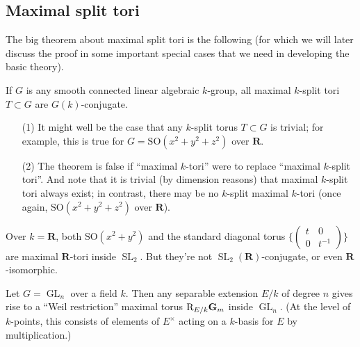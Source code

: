 \documentclass[10pt]{article}
\newcommand{\RR}{\mathbf{R}}
\newcommand{\GL}{\operatorname{GL}}
\newcommand{\SL}{\operatorname{SL}}
\renewcommand{\(}{\left(}
\renewcommand{\)}{\right)}
\newcommand{\SO}{\mathrm{SO}}
\numberwithin{thm}{subsection}
\begin{document}
\subsection{Maximal split tori}
The big theorem about maximal split tori is the following (for which we will later discuss
the proof in some important special cases that we need in developing the basic theory).
\begin{thm}\label{maxsplittori}
If $G$ is any smooth connected linear algebraic $k$-group,
all maximal $k$-split tori $T\subset G$
are $G(k)$-conjugate.
\end{thm}
\begin{rem}
\begin{itemize}\item[(1)]It might well be the case that any $k$-split torus $T\subset G$
is trivial; for example, this is true for $G=\SO(x^2+y^2+z^2)$ over $\RR$.
\item[(2)]The theorem is false if ``maximal $k$-tori'' were to replace ``maximal $k$-split tori''.
And note that it is trivial (by dimension reasons) that maximal $k$-split tori always
exist; in contrast, there may be no $k$-split maximal $k$-tori (once again,
$\SO(x^2+y^2+z^2)$ over $\RR$). 
\end{itemize}\end{rem}
\begin{ex} Over $k=\RR$, both $\SO(x^2+y^2)$ and the standard diagonal torus $\{\(\begin{smallmatrix}t&0\\0&t^{-1}\end{smallmatrix}\)\}$ are maximal $\RR$-tori
inside $\SL_2$. But they're not $\SL_2(\RR)$-conjugate, or even $\RR$-isomorphic.
\end{ex}
\begin{ex}Let $G=\GL_n$ over a field $k$.
Then any separable extension $E/k$ of degree $n$
gives rise to a ``Weil restriction'' maximal torus ${\rm{R}}_{E/k}\mathbf{G}_m$ inside $\GL_n$.
(At the level of $k$-points, this consists of elements of $E^\times$ acting on a
$k$-basis for $E$ by multiplication.)
\end{ex}
\end{document}
